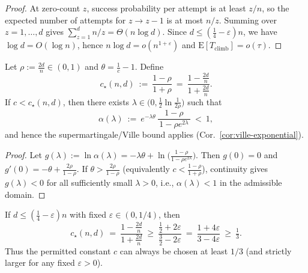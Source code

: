 \documentclass[lettersize,journal]{IEEEtran}
\newcommand{\EE}{\text{E}}
\begin{document}
\begin{proof}
	At zero-count $z$, success probability per attempt is at least $z/n$, so the expected number of attempts for $z\!\to\! z-1$ is at most $n/z$.
	Summing over $z=1,\dots,d$ gives $\sum_{z=1}^{d}n/z=\Theta(n\log d)$.
	Since $d\le(\tfrac14-\varepsilon)n$, we have $\log d=O(\log n)$, hence $n\log d=o(n^{1+\varepsilon})$ and $\EE[T_{\mathrm{climb}}]=o(\tau)$.
\end{proof}




\begin{lemma}\label{lem:c-threshold-instance}
	Let $\rho:=\tfrac{2d}{n}\in(0,1)$ and $\theta=\tfrac{1}{c}-1$. Define
	\[
	c_\star(n,d)\ :=\ \frac{1-\rho}{1+\rho}\ =\ \frac{1-\tfrac{2d}{n}}{1+\tfrac{2d}{n}}.
	\]
	If $c<c_\star(n,d)$, then there exists $\lambda\in\!\big(0,\tfrac12\ln\tfrac{1}{2\rho}\big)$ such that
	\[
	\alpha(\lambda)\ :=\ e^{-\lambda\theta}\,\frac{1-\rho}{\,1-\rho e^{2\lambda}\,}\ <\ 1,
	\]
	and hence the supermartingale/Ville bound applies (Cor.~\ref{cor:ville-exponential}).
\end{lemma}

\begin{proof}
	Let $g(\lambda):=\ln\alpha(\lambda)=-\lambda\theta+\ln\!\big(\tfrac{1-\rho}{1-\rho e^{2\lambda}}\big)$. 
	Then $g(0)=0$ and $g'(0)=-\theta+\tfrac{2\rho}{1-\rho}$. 
	If $\theta>\tfrac{2\rho}{1-\rho}$ (equivalently $c<\tfrac{1-\rho}{1+\rho}$), continuity gives $g(\lambda)<0$ for all sufficiently small $\lambda>0$, i.e., $\alpha(\lambda)<1$ in the admissible domain.
\end{proof}

\begin{corollary}\label{cor:c-floor}
	If $d\le (\tfrac14-\varepsilon)n$ with fixed $\varepsilon\in(0,1/4)$, then
	\[
	c_\star(n,d)\ =\ \frac{1-\tfrac{2d}{n}}{1+\tfrac{2d}{n}}
	\ \ge\  \frac{\tfrac12+2\varepsilon}{\tfrac32-2\varepsilon}
	\ =\ \frac{1+4\varepsilon}{3-4\varepsilon}\ \ge\ \tfrac13.
	\]
	Thus the permitted constant $c$ can always be chosen at least $1/3$ (and strictly larger for any fixed $\varepsilon>0$).
\end{corollary}
\end{document}
